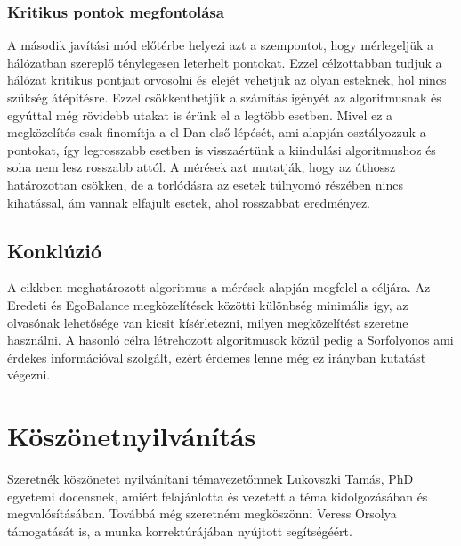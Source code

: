 \documentclass[12pt]{report}
\begin{document}
\pagebreak

\subsection{Kritikus pontok megfontolása}

A második javítási mód előtérbe helyezi azt a szempontot, hogy mérlegeljük a hálózatban szereplő ténylegesen leterhelt pontokat.
Ezzel célzottabban tudjuk a hálózat kritikus pontjait orvosolni és elejét vehetjük az olyan esteknek, hol nincs szükség átépítésre.
Ezzel csökkenthetjük a számítás igényét az algoritmusnak és egyúttal még rövidebb utakat is érünk el a legtöbb esetben.
Mivel ez a megközelítés csak finomítja a cl-Dan első lépését, ami alapján osztályozzuk a pontokat, így legrosszabb esetben is visszaértünk a kiindulási algoritmushoz és soha nem lesz rosszabb attól.
A mérések azt mutatják, hogy az úthossz határozottan csökken, de a torlódásra az esetek túlnyomó részében nincs kihatással, ám vannak elfajult esetek, ahol rosszabbat eredményez.

\section{Konklúzió}

A cikkben \cite{avin_demand-aware_nodate} meghatározott algoritmus a mérések alapján megfelel a céljára.
Az Eredeti és EgoBalance megközelítések közötti különbség minimális így, az olvasónak lehetősége van kicsit kísérletezni, milyen megközelítést szeretne használni.
A hasonló célra létrehozott algoritmusok közül pedig a Sorfolyonos ami érdekes információval szolgált, ezért érdemes lenne még ez irányban kutatást végezni.


\chapter{Köszönetnyilvánítás}

Szeretnék köszönetet nyilvánítani témavezetőmnek Lukovszki Tamás, PhD egyetemi docensnek, amiért felajánlotta és vezetett a téma kidolgozásában és megvalósításában.
Továbbá még szeretném megköszönni Veress Orsolya támogatását is, a munka korrektúrájában nyújtott segítségéért.  





	
\end{document}
